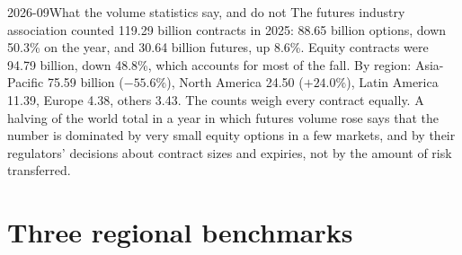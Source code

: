 \begin{omfigure}

\label{fig:m1:index-and-single-stock-futures-worldwide:regions}
\end{omfigure}

\begin{dated}{2026-09}{What the volume statistics say, and do not}\label{dat:m1:index-and-single-stock-futures-worldwide:fia}
The futures industry association counted 119.29 billion contracts in 2025:
88.65 billion options, down 50.3\% on the year, and 30.64 billion futures, up
8.6\%. Equity contracts were 94.79 billion, down 48.8\%, which accounts for
most of the fall. By region: Asia-Pacific 75.59 billion ($-55.6\%$), North
America 24.50 ($+24.0\%$), Latin America 11.39, Europe 4.38, others 3.43. The
counts weigh every contract equally. A halving of the world total in a year in
which futures volume rose says that the number is dominated by very small
equity options in a few markets, and by their regulators' decisions about
contract sizes and expiries, not by the amount of risk transferred.
\end{dated}

\section{Three regional benchmarks}

